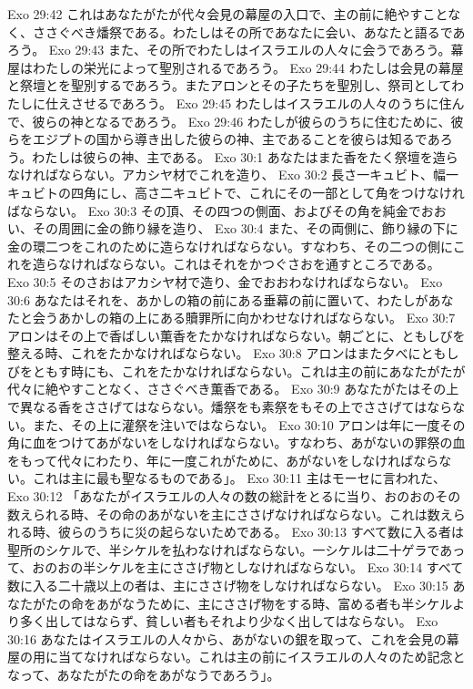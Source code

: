 Exo 29:42  これはあなたがたが代々会見の幕屋の入口で、主の前に絶やすことなく、ささぐべき燔祭である。わたしはその所であなたに会い、あなたと語るであろう。
Exo 29:43  また、その所でわたしはイスラエルの人々に会うであろう。幕屋はわたしの栄光によって聖別されるであろう。
Exo 29:44  わたしは会見の幕屋と祭壇とを聖別するであろう。またアロンとその子たちを聖別し、祭司としてわたしに仕えさせるであろう。
Exo 29:45  わたしはイスラエルの人々のうちに住んで、彼らの神となるであろう。
Exo 29:46  わたしが彼らのうちに住むために、彼らをエジプトの国から導き出した彼らの神、主であることを彼らは知るであろう。わたしは彼らの神、主である。
Exo 30:1  あなたはまた香をたく祭壇を造らなければならない。アカシヤ材でこれを造り、
Exo 30:2  長さ一キュビト、幅一キュビトの四角にし、高さ二キュビトで、これにその一部として角をつけなければならない。
Exo 30:3  その頂、その四つの側面、およびその角を純金でおおい、その周囲に金の飾り縁を造り、
Exo 30:4  また、その両側に、飾り縁の下に金の環二つをこれのために造らなければならない。すなわち、その二つの側にこれを造らなければならない。これはそれをかつぐさおを通すところである。
Exo 30:5  そのさおはアカシヤ材で造り、金でおおわなければならない。
Exo 30:6  あなたはそれを、あかしの箱の前にある垂幕の前に置いて、わたしがあなたと会うあかしの箱の上にある贖罪所に向かわせなければならない。
Exo 30:7  アロンはその上で香ばしい薫香をたかなければならない。朝ごとに、ともしびを整える時、これをたかなければならない。
Exo 30:8  アロンはまた夕べにともしびをともす時にも、これをたかなければならない。これは主の前にあなたがたが代々に絶やすことなく、ささぐべき薫香である。
Exo 30:9  あなたがたはその上で異なる香をささげてはならない。燔祭をも素祭をもその上でささげてはならない。また、その上に灌祭を注いではならない。
Exo 30:10  アロンは年に一度その角に血をつけてあがないをしなければならない。すなわち、あがないの罪祭の血をもって代々にわたり、年に一度これがために、あがないをしなければならない。これは主に最も聖なるものである」。
Exo 30:11  主はモーセに言われた、
Exo 30:12  「あなたがイスラエルの人々の数の総計をとるに当り、おのおのその数えられる時、その命のあがないを主にささげなければならない。これは数えられる時、彼らのうちに災の起らないためである。
Exo 30:13  すべて数に入る者は聖所のシケルで、半シケルを払わなければならない。一シケルは二十ゲラであって、おのおの半シケルを主にささげ物としなければならない。
Exo 30:14  すべて数に入る二十歳以上の者は、主にささげ物をしなければならない。
Exo 30:15  あなたがたの命をあがなうために、主にささげ物をする時、富める者も半シケルより多く出してはならず、貧しい者もそれより少なく出してはならない。
Exo 30:16  あなたはイスラエルの人々から、あがないの銀を取って、これを会見の幕屋の用に当てなければならない。これは主の前にイスラエルの人々のため記念となって、あなたがたの命をあがなうであろう」。
